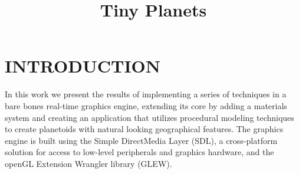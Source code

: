 \documentclass[a4paper,twoside]{article}
\begin{document}
\title{Tiny Planets}

\author{
}



\onecolumn \maketitle \normalsize \vfill

\section{\uppercase{Introduction}}
\label{sec:introduction}
\noindent In this work we present the results of implementing a series of techniques in a bare bones real-time graphics engine, extending its core by adding a materials system and creating an application that utilizes procedural modeling techniques to create planetoids with natural looking geographical features. The graphics engine is built using the Simple DirectMedia Layer (SDL), a cross-platform solution for access to low-level peripherals and graphics hardware, and the openGL Extension Wrangler library (GLEW).
\end{document}
